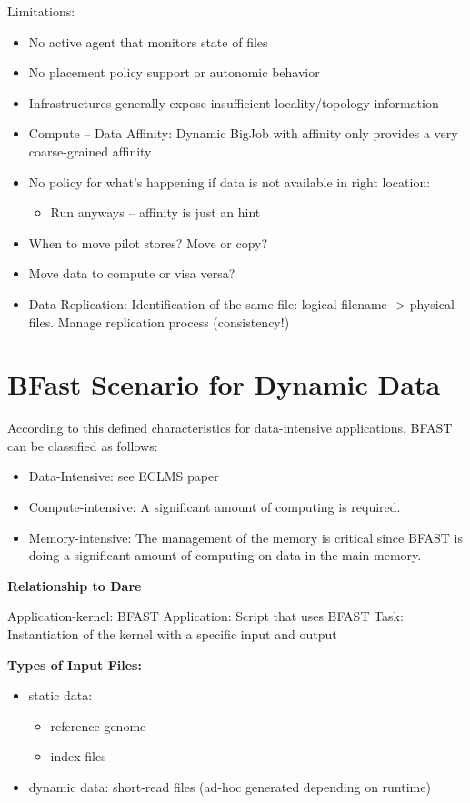 \documentclass[]{article}
\begin{document}
Limitations:
\begin{itemize}
    \item No active agent that monitors state of files
    \item No placement policy support or autonomic behavior
    \item Infrastructures generally expose insufficient locality/topology information
    \item Compute – Data Affinity: Dynamic BigJob with affinity only provides a very coarse-grained affinity
    \item No policy for what’s happening if data is not available in right location:
    \begin{itemize}
        \item Run anyways – affinity is just an hint
    \end{itemize}
    \item When to move pilot stores? Move or copy?
    \item Move data to compute or visa versa?
    \item Data Replication: Identification of the same file: logical filename -> physical files. Manage replication process (consistency!)
\end{itemize}



\section{BFast Scenario for Dynamic Data}

According to this defined characteristics for data-intensive applications, BFAST can be classified as follows:
\begin{itemize}
    \item Data-Intensive: see ECLMS paper
    \item Compute-intensive: A significant amount of computing is required.
    \item Memory-intensive: The management of the memory is critical since BFAST 
    is doing a significant amount of computing on data in the main memory.
\end{itemize}


\textbf{Relationship to Dare}

Application-kernel: BFAST 
Application: Script that uses BFAST
Task: Instantiation of the kernel with a specific input and output





\textbf{Types of Input Files:}
\begin{itemize}
	\item static data: 
	\begin{itemize}
		\item reference genome
		\item index files
	\end{itemize}
	\item dynamic data: short-read files (ad-hoc generated depending on runtime)
\end{itemize}
\end{document}
